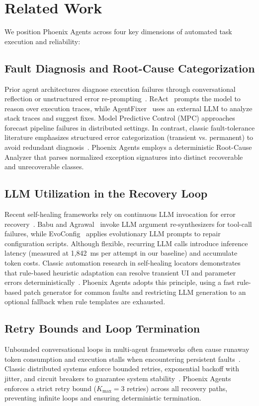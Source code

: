 \documentclass[conference]{IEEEtran}
\begin{document}
\section{Related Work}

We position Phoenix Agents across four key dimensions of automated task execution and reliability:

\subsection{Fault Diagnosis and Root-Cause Categorization}
Prior agent architectures diagnose execution failures through conversational reflection or unstructured error re-prompting~\cite{yao2023,wu2024,ju2025}. ReAct~\cite{yao2023} prompts the model to reason over execution traces, while AgentFixer~\cite{mulian2026} uses an external LLM to analyze stack traces and suggest fixes. Model Predictive Control (MPC) approaches~\cite{patel2026a,patel2026b} forecast pipeline failures in distributed settings. In contrast, classic fault-tolerance literature emphasizes structured error categorization (transient vs. permanent) to avoid redundant diagnosis~\cite{gray1991}. Phoenix Agents employs a deterministic Root-Cause Analyzer that parses normalized exception signatures into distinct recoverable and unrecoverable classes.

\subsection{LLM Utilization in the Recovery Loop}
Recent self-healing frameworks rely on continuous LLM invocation for error recovery~\cite{babu2026,jeong2026,guo2026,bara2026}. Babu and Agrawal~\cite{babu2026} invoke LLM argument re-synthesizers for tool-call failures, while EvoConfig~\cite{guo2026} applies evolutionary LLM prompts to repair configuration scripts. Although flexible, recurring LLM calls introduce inference latency (measured at 1,842~ms per attempt in our baseline) and accumulate token costs. Classic automation research in self-healing locators demonstrates that rule-based heuristic adaptation can resolve transient UI and parameter errors deterministically~\cite{leotta2018}. Phoenix Agents adopts this principle, using a fast rule-based patch generator for common faults and restricting LLM generation to an optional fallback when rule templates are exhausted.

\subsection{Retry Bounds and Loop Termination}
Unbounded conversational loops in multi-agent frameworks often cause runaway token consumption and execution stalls when encountering persistent faults~\cite{wang2026}. Classic distributed systems enforce bounded retries, exponential backoff with jitter, and circuit breakers to guarantee system stability~\cite{nygard2007}. Phoenix Agents enforces a strict retry bound ($K_{\text{max}}=3$ retries) across all recovery paths, preventing infinite loops and ensuring deterministic termination.
\end{document}
